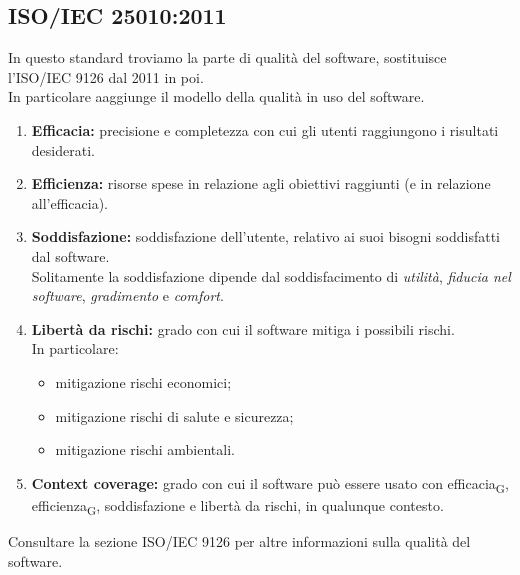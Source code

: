 \subsection{ISO/IEC 25010:2011}
In questo standard troviamo la parte di qualità del software, sostituisce l'ISO/IEC 9126 dal 2011 in poi.\\
In particolare aaggiunge il modello della qualità in uso del software.\\
\begin{enumerate}
	\item \textbf{Efficacia:} precisione e completezza con cui gli utenti raggiungono i risultati desiderati.
	\item \textbf{Efficienza:} risorse spese in relazione agli obiettivi raggiunti (e in relazione all'efficacia).
	\item \textbf{Soddisfazione:} soddisfazione dell'utente, relativo ai suoi bisogni soddisfatti dal software.\\Solitamente la soddisfazione dipende dal soddisfacimento di \textit{utilità}, \textit{fiducia nel software}, \textit{gradimento} e \textit{comfort}.
	\item \textbf{Libertà da rischi:} grado con cui il software mitiga i possibili rischi.\\In particolare:
		\begin{itemize}
			\item mitigazione rischi economici;
			\item mitigazione rischi di salute e sicurezza;
			\item mitigazione rischi ambientali.
		\end{itemize}
	\item \textbf{Context coverage:} grado con cui il software può essere usato con efficacia\textsubscript{G}, efficienza\textsubscript{G}, soddisfazione e libertà da rischi, in qualunque contesto.
\end{enumerate}
Consultare la sezione ISO/IEC 9126 per altre informazioni sulla qualità del software.
